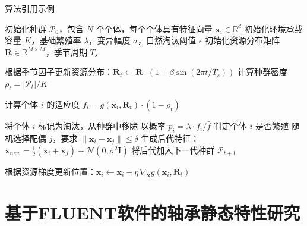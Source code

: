 \documentclass[a4paper, twoside, openany]{NCEPUMaster}
\begin{document}
算法引用示例  %


\begin{algorithm}[h]
  \caption{基于个体模拟的种群动态演化算法}
  \label{alg:population-sim}
  \begin{algorithmic}[1]
    \STATE 初始化种群 $\mathcal{P}_0$，包含 $N$ 个个体，每个个体具有特征向量 $\mathbf{x}_i \in \mathbb{R}^d$
    \STATE 初始化环境承载容量 $K$，基础繁殖率 $\lambda$，变异幅度 $\sigma$，自然淘汰阈值 $\epsilon$
    \STATE 初始化资源分布矩阵 $\mathbf{R} \in \mathbb{R}^{M \times M}$，季节周期 $T_s$

      \STATE 根据季节因子更新资源分布：$\mathbf{R}_t \gets \mathbf{R} \cdot (1 + \beta \sin(2\pi t / T_s))$
      \STATE 计算种群密度 $\rho_t = |\mathcal{P}_t| / K$

        \STATE 计算个体 $i$ 的适应度 $f_i = g(\mathbf{x}_i, \mathbf{R}_t) \cdot (1 - \rho_t)$

          \STATE 将个体 $i$ 标记为淘汰，从种群中移除
        \ELSE
          \STATE 以概率 $p_i = \lambda \cdot f_i / \bar{f}$ 判定个体 $i$ 是否繁殖
            \STATE 随机选择配偶 $j$，要求 $\|\mathbf{x}_i - \mathbf{x}_j\| \leq \delta$
            \STATE 生成后代特征：$\mathbf{x}_{new} = \frac{1}{2}(\mathbf{x}_i + \mathbf{x}_j) + \mathcal{N}(0, \sigma^2 \mathbf{I})$
            \STATE 将后代加入下一代种群 $\mathcal{P}_{t+1}$
          \ENDIF
        \ENDIF
      \ENDWHILE

        \STATE 根据资源梯度更新位置：$\mathbf{x}_i \gets \mathbf{x}_i + \eta \, \nabla_{\mathbf{x}} g(\mathbf{x}_i, \mathbf{R}_t)$
      \ENDFOR
    \ENDFOR
  \end{algorithmic}
\end{algorithm}

\chapter{基于FLUENT软件的轴承静态特性研究}

\end{document}
